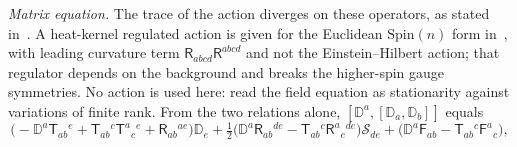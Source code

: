 \emph{Matrix equation.} The trace of the action diverges on these operators, as stated in~\cite{HanadaKawaiKimura2006}. A heat-kernel regulated action is given for the Euclidean \(\mathrm{Spin}(n)\) form in~\cite{Hanada2006}, with leading curvature term \(\mathsf R_{abcd}\mathsf R^{abcd}\) and not the Einstein--Hilbert action; that regulator depends on the background and breaks the higher-spin gauge symmetries. No action is used here: read the field equation as stationarity against variations of finite rank. From the two relations alone, \([\mathbb D^a,[\mathbb D_a,\mathbb D_b]]\) equals
\[
\bigl(-\mathbb D^a\mathsf T_{ab}{}^e+\mathsf T_{ab}{}^c\mathsf T^a{}_c{}^e+\mathsf R_{ab}{}^{ae}\bigr)\mathbb D_e+\tfrac12\bigl(\mathbb D^a\mathsf R_{ab}{}^{de}-\mathsf T_{ab}{}^c\mathsf R^a{}_c{}^{de}\bigr)\mathcal S_{de}+\bigl(\mathbb D^a\mathsf F_{ab}-\mathsf T_{ab}{}^c\mathsf F^a{}_c\bigr),
\]
